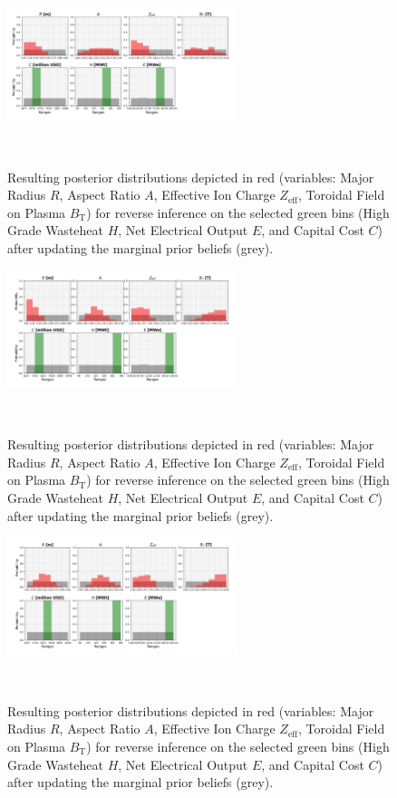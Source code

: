 \begin{figure}[ht]
    \centering
    \includegraphics[width=0.6\textwidth]{figures/TE_results/march_data/config(57)_3outputs_v2_5.png}
    \caption{Resulting posterior distributions depicted in red (variables: Major Radius $R$, Aspect Ratio $A$, Effective Ion Charge $Z_{\text{eff}}$, Toroidal Field on Plasma $B_{\text{T}}$) for reverse
    inference on the selected green bins (High Grade Wasteheat $H$, Net Electrical Output $E$, and  Capital Cost $C$) after updating the marginal prior beliefs (grey).}~\label{fig:config(57)_3outputs_V2_5}
\end{figure}

\begin{figure}[ht]
    \centering
    \includegraphics[width=0.6\textwidth]{figures/TE_results/march_data/config(57)_3outputs_V2_6.png}
    \caption{Resulting posterior distributions depicted in red (variables: Major Radius $R$, Aspect Ratio $A$, Effective Ion Charge $Z_{\text{eff}}$, Toroidal Field on Plasma $B_{\text{T}}$) for reverse
    inference on the selected green bins (High Grade Wasteheat $H$, Net Electrical Output $E$, and  Capital Cost $C$) after updating the marginal prior beliefs (grey).}~\label{fig:config(57)_3outputs_V2_6}
\end{figure}

\begin{figure}[ht]
    \centering
    \includegraphics[width=0.6\textwidth]{figures/TE_results/march_data/config(57)_3outputs_V2_7.png}
    \caption{Resulting posterior distributions depicted in red (variables: Major Radius $R$, Aspect Ratio $A$, Effective Ion Charge $Z_{\text{eff}}$, Toroidal Field on Plasma $B_{\text{T}}$) for reverse
    inference on the selected green bins (High Grade Wasteheat $H$, Net Electrical Output $E$, and  Capital Cost $C$) after updating the marginal prior beliefs (grey).}~\label{fig:config(57)_3outputs_V2_7}
\end{figure}

